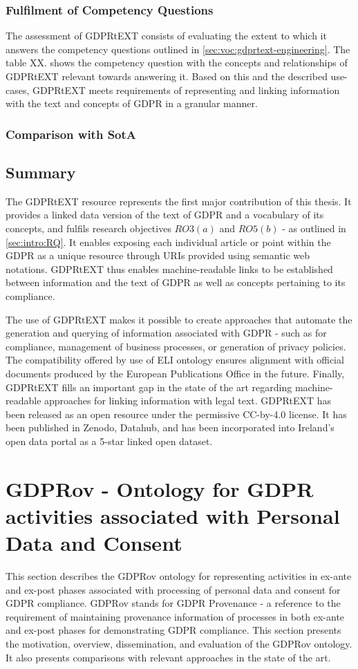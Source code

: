 \subsubsection{Fulfilment of Competency Questions}
The assessment of GDPRtEXT consists of evaluating the extent to which it answers the competency questions outlined in \autoref{sec:voc:gdprtext-engineering}.
The table XX. shows the competency question with the concepts and relationships of GDPRtEXT relevant towards answering it.
Based on this and the described use-cases, GDPRtEXT meets requirements of representing and linking information with the text and concepts of GDPR in a granular manner.

\subsubsection{Comparison with SotA}

\subsection*{Summary}
The GDPRtEXT resource represents the first major contribution of this thesis. It provides a linked data version of the text of GDPR and a vocabulary of its concepts, and fulfils research objectives $RO3(a)$ and $RO5(b)$ - as outlined in \autoref{sec:intro:RQ}. It enables exposing each individual article or point within the GDPR as a unique resource through URIs provided using semantic web notations.
GDPRtEXT thus enables machine-readable links to be established between information and the text of GDPR as well as concepts pertaining to its compliance.

The use of GDPRtEXT makes it possible to create approaches that automate the generation and querying of information associated with GDPR - such as for compliance, management of business processes, or generation of privacy policies. The compatibility offered by use of ELI ontology ensures alignment with official documents produced by the European Publications Office in the future.
Finally, GDPRtEXT fills an important gap in the state of the art regarding machine-readable approaches for linking information with legal text.
GDPRtEXT has been released as an open resource under the permissive CC-by-4.0 license. It has been published in Zenodo, Datahub, and has been incorporated into Ireland’s open data portal as a 5-star linked open dataset.

\section{GDPRov - Ontology for GDPR activities associated with Personal Data and Consent}\label{sec:voc:GDPRov}
This section describes the GDPRov ontology for representing activities in ex-ante and ex-post phases associated with processing of personal data and consent for GDPR compliance. GDPRov stands for GDPR Provenance - a reference to the requirement of maintaining provenance information of processes in both ex-ante and ex-post phases for demonstrating GDPR compliance. This section presents the motivation, overview, dissemination, and evaluation of the GDPRov ontology. It also presents comparisons with relevant approaches in the state of the art. 

